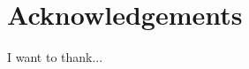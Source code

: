 \documentclass[12pt,twoside]{book}
\begin{document}
\chapter*{Acknowledgements}
I want to thank...

\tableofcontents
\listoftables
\listoffigures















\begin{appendices}



\end{appendices}
\end{document}
